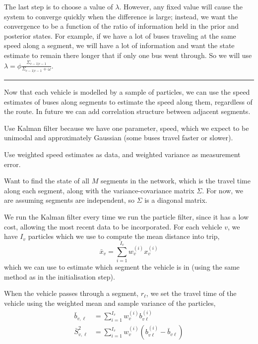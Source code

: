 \documentclass[draftcls,a4paper,onecolumn]{IEEEtran}\usepackage[]{graphicx}\usepackage[]{color}
\begin{document}
The last step is to choose a value of $\lambda$.
However, any fixed value will cause the system to converge quickly when the difference is large;
instead, we want the convergence to be a function of the ratio of information held
in the prior and posterior states. 
For example, if we have a lot of buses traveling at the same speed along a segment, 
we will have a lot of information and want the state estimate to remain there
longer that if only one bus went through. 
So we will use $\lambda = \phi \frac{\Sigma_{c-1|c-1}}{\Sigma_{c-1|c-1} + \omega}$.



\vspace{2em}
\hrule
Now that each vehicle is modelled by a sample of particles,
we can use the speed estimates of buses along segments to estimate
the speed along them, regardless of the route.
In future we can add correlation structure between adjacent segments.

Use Kalman filter because we have one parameter, speed, 
which we expect to be unimodal and approximately Gaussian
(some buses travel faster or slower).

Use weighted speed estimates as data,
and weighted variance as measurement error.

Want to find the state of all $M$ segments in the network,
which is the travel time along each segment,
along with the variance-covariance matrix $\Sigma$.
For now, we are assuming segments are independent,
so $\Sigma$ is a diagonal matrix.


We run the Kalman filter every time we run the particle filter,
since it has a low cost, allowing the most recent data to be incorporated.
For each vehicle $v$, we have $I_v$ particles which we use to
compute the mean distance into trip,
\begin{equation}
  \label{eq:weighted_mean}
  \bar x_v = \sum_{i=1}^{I_v} w_v^{(i)} x_v^{(i)}
\end{equation}
which we can use to estimate which segment the vehicle is in
(using the same method as in the initialisation step).

When the vehicle passes through a segment, $r_\ell$,
we set the travel time of the vehicle using the 
weighted mean and sample variance of the particles,
\begin{align}
  \label{eq:weighted_travel}
  \bar b_{v,\ell} &= \sum_{i=1}^{I_v} w_v^{(i)} b_{v\ell}^{(i)} \\
  \bar S_{v,\ell}^2 &= \sum_{i=1}^{I_v} w_v^{(i)}(b_{v\ell}^{(i)} - \bar b_{v\ell})
\end{align}
\end{document}
